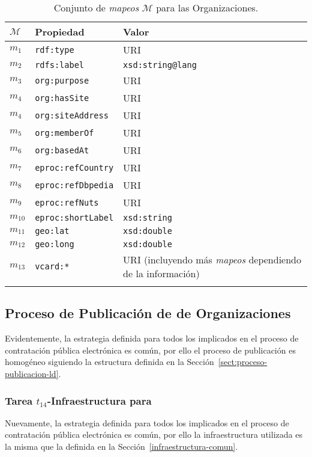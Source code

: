 \begin{longtable}[c]{|p{2cm}|p{8cm}|p{4cm}|} 
\hline
  \textbf{$\mathcal{M}$} &  \textbf{Propiedad} & \textbf{Valor} \\\hline
\endhead
 $m_1$ & \texttt{rdf:type} & \gls{URI} \\ \hline
 $m_2$ & \texttt{rdfs:label} & \texttt{xsd:string@lang}  \\ \hline
 $m_3$ & \texttt{org:purpose} & URI \\ \hline
 $m_4$ & \texttt{org:hasSite} & URI \\ \hline
 $m_4$ & \texttt{org:siteAddress} & URI  \\ \hline
 $m_5$ & \texttt{org:memberOf} & URI \\ \hline
 $m_6$ & \texttt{org:basedAt} & URI  \\ \hline
 $m_7$ & \texttt{eproc:refCountry} & URI \\ \hline  
 $m_8$ & \texttt{eproc:refDbpedia} & URI \\ \hline
 $m_9$ & \texttt{eproc:refNuts}  & URI \\ \hline
 $m_{10}$ & \texttt{eproc:shortLabel}  & \texttt{xsd:string} \\ \hline   
 $m_{11}$ & \texttt{geo:lat}  & \texttt{xsd:double} \\ \hline
 $m_{12}$ & \texttt{geo:long}  & \texttt{xsd:double} \\ \hline   
 $m_{13}$ & \texttt{vcard:*}  & URI (incluyendo más \textit{mapeos} dependiendo de la información) \\ \hline         
\hline
\caption{Conjunto de \textit{mapeos} $\mathcal{M}$ para las Organizaciones.}\label{table:orgs-mappings}\\    
\end{longtable}

\subsection{Proceso de Publicación de \linkeddata de Organizaciones}
Evidentemente, la estrategia definida para todos los \datasets implicados en el proceso de contratación pública 
electrónica es común, por ello el proceso de publicación es homogéneo siguiendo la estructura definida 
en la Sección~\ref{sect:proceso-publicacion-ld}.

\subsubsection{Tarea $t_{14}$-Infraestructura para \linkeddata}
Nuevamente, la estrategia definida para todos los \datasets implicados en el proceso de contratación pública 
electrónica es común, por ello la infraestructura utilizada es la misma que la definida 
en la Sección~\ref{infraestructura-comun}.

